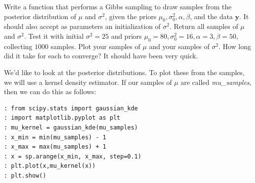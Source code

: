 \begin{problem}
Write a function that performs a Gibbs sampling to draw samples from the posterior distribution of $\mu$ and $\sigma^{2}$, given the priors $\mu_{0}, \sigma_{0}^{2}, \alpha,\beta$, and the data $\mathbf{y}$. It should also accept as parameters an initialization of $\sigma^{2}$. Return all samples of $\mu$ and $\sigma^{2}$. Test it with initial $\sigma^{2} = 25$ and priors $\mu_{0}=80, \sigma_{0}^{2} = 16, \alpha = 3, \beta = 50$, collecting $1000$ samples. Plot your samples of $\mu$ and your samples of $\sigma^{2}$. How long did it take for each to converge? It should have been very quick.
\end{problem}

We'd like to look at the posterior distributions. To plot these from the samples, we will use a kernel density estimator. If our samples of $\mu$ are called \emph{mu\_samples}, then we can do this as follows:
\begin{lstlisting}
: from scipy.stats import gaussian_kde
: import matplotlib.pyplot as plt
: mu_kernel = gaussian_kde(mu_samples)
: x_min = min(mu_samples) - 1
: x_max = max(mu_samples) + 1
: x = sp.arange(x_min, x_max, step=0.1)
: plt.plot(x,mu_kernel(x))
: plt.show()
\end{lstlisting}

